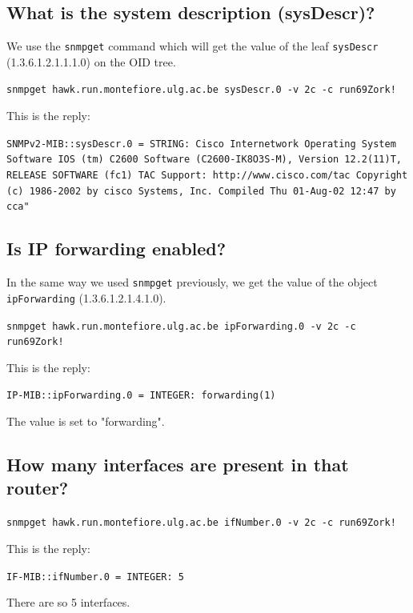\documentclass[a4paper,titlepage]{article}
\begin{document}
	\subsection{What is the system description (sysDescr)?}
We use the \texttt{snmpget} command which will get the value of the leaf \texttt{sysDescr} (1.3.6.1.2.1.1.1.0) on the OID tree.
\begin{center}
	\texttt{snmpget hawk.run.montefiore.ulg.ac.be sysDescr.0 -v 2c -c run69Zork!}
\end{center}
This is the reply: 
\begin{center}
	\texttt{SNMPv2-MIB::sysDescr.0 = STRING: Cisco Internetwork Operating System Software 
IOS (tm) C2600 Software (C2600-IK8O3S-M), Version 12.2(11)T,  RELEASE SOFTWARE (fc1)
TAC Support: http://www.cisco.com/tac
Copyright (c) 1986-2002 by cisco Systems, Inc.
Compiled Thu 01-Aug-02 12:47 by cca"}
\end{center}


	\subsection{Is IP forwarding enabled?}
In the same way we used \texttt{snmpget} previously, we get the value of the object \texttt{ipForwarding} (1.3.6.1.2.1.4.1.0).
\begin{center}
	\texttt{snmpget hawk.run.montefiore.ulg.ac.be ipForwarding.0 -v 2c -c run69Zork!}
\end{center}
This is the reply: 
\begin{center}
	\texttt{IP-MIB::ipForwarding.0 = INTEGER: forwarding(1)}
\end{center}
The value is set to "forwarding".

	\subsection{How many interfaces are present in that router?}
\begin{center}
	\texttt{snmpget hawk.run.montefiore.ulg.ac.be ifNumber.0 -v 2c -c run69Zork!}
\end{center}
This is the reply: 
\begin{center}
	\texttt{IF-MIB::ifNumber.0 = INTEGER: 5}
\end{center}
There are so 5 interfaces.

\paragraph{}
\end{document}

